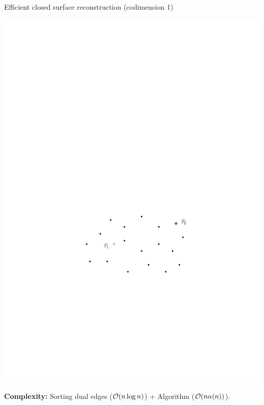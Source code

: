 \begin{frame}[c]{Efficient closed surface reconstruction (codimension 1)}
\begin{minipage}[c]{0.5\linewidth}
\begin{algorithm}[H]
		\end{algorithm}
	\end{minipage}%
	\begin{minipage}[c]{0.5\linewidth}
		\includegraphics[width=\linewidth]{dual/algo_init}
	\end{minipage}
	
	\textbf{Complexity:} Sorting dual edges ($\mathcal{O}(n \log n)$) + Algorithm ($\mathcal{O}(n \alpha(n))$).
\end{frame}

